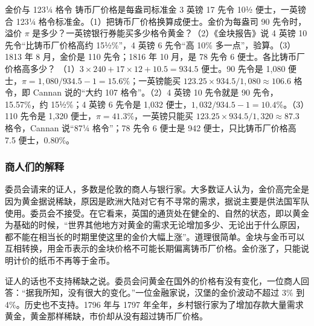 \begin{example}{金价与 123¼ 格令}\label{ex:bullion-mint}
铸币厂价格是每盎司标准金 3 英镑 17 先令 10½ 便士，一英镑合 123¼ 格令标准金。（1）把铸币厂价格换算成便士。金价为每盎司 90 先令时，溢价 $\pi$ 是多少？一英镑银行券能买多少格令黄金？（2）《金块报告》说 4 英镑 10 先令“比铸币厂价格高约 15½\%”，4 英镑 6 先令“高 10\% 多一点”，验算。（3）1813 年 8 月，金价是 110 先令；1816 年 10 月，是 78 先令 6 便士。各比铸币厂价格高多少？
\solution （1）$3\times240+17\times12+10.5=934.5$ 便士。90 先令是 1,080 便士，$\pi=1{,}080/934.5-1=15.6\%$；一英镑能买 $123.25\times934.5/1{,}080\approx106.6$ 格令，即 Cannan 说的“大约 107 格令”。（2）4 英镑 10 先令就是 90 先令，15.57\%，约 15½\%；4 英镑 6 先令是 1,032 便士，$1{,}032/934.5-1=10.4\%$。（3）110 先令是 1,320 便士，$\pi=41.3\%$，一英镑只能买 $123.25\times934.5/1{,}320\approx87.3$ 格令，Cannan 说“87¼ 格令”；78 先令 6 便士是 942 便士，只比铸币厂价格高 7.5 便士，0.80\%。
\end{example}


\subsubsection{商人们的解释}
委员会请来的证人，多数是伦敦的商人与银行家。大多数证人认为，金价高完全是因为黄金据说稀缺，原因是欧洲大陆对它有不寻常的需求，据说主要是供法国军队使用\cite{bullion1810}。委员会不接受。在它看来，英国的通货处在健全的、自然的状态，即以黄金为基础的时候，“世界其他地方对黄金的需求无论增加多少、无论出于什么原因，都不能在相当长的时期里使这里的金价大幅上涨”\cite{bullion1810}。道理很简单。金块与金币可以互相转换，用金币表示的金块价格不可能长期偏离铸币厂价格。金价涨了，只能说明计价的纸币不再等于金币。

证人的话也不支持稀缺之说。委员会问黄金在国外的价格有没有变化，一位商人回答：“据我所知，没有很大的变化。”\cite{bullion1810}一位金融家说，汉堡的金价波动不超过 3\% 到 4\%\cite{bullion1810}。历史也不支持。1796 年与 1797 年全年，乡村银行家为了增加存款大量需求黄金，黄金那样稀缺，市价却从没有超过铸币厂价格\cite{bullion1810}。

